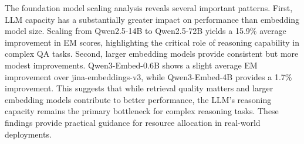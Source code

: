 The foundation model scaling analysis reveals several important patterns. First, LLM capacity has a substantially greater impact on performance than embedding model size. Scaling from Qwen2.5-14B to Qwen2.5-72B yields a 15.9\% average improvement in EM scores, highlighting the critical role of reasoning capability in complex QA tasks. Second, larger embedding models provide consistent but more modest improvements. Qwen3-Embed-0.6B shows a slight average EM improvement over jina-embeddings-v3, while Qwen3-Embed-4B provides a 1.7\% improvement. This suggests that while retrieval quality matters and larger embedding models contribute to better performance, the LLM's reasoning capacity remains the primary bottleneck for complex reasoning tasks. These findings provide practical guidance for resource allocation in real-world deployments.



